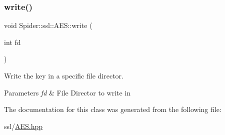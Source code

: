 \subsubsection{\texorpdfstring{write()}{write()}}
{\footnotesize\ttfamily void Spider\+::ssl\+::\+A\+E\+S\+::write (\begin{DoxyParamCaption}\item[{int}]{fd }\end{DoxyParamCaption})}



Write the key in a specific file director. 


\begin{DoxyParams}{Parameters}
{\em fd} & File Director to write in \\
\hline
\end{DoxyParams}


The documentation for this class was generated from the following file\+:\begin{DoxyCompactItemize}
\item 
ssl/\hyperlink{_a_e_s_8hpp}{A\+E\+S.\+hpp}\end{DoxyCompactItemize}
